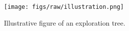 \begin{figure}[H]
    \centering
    \texttt{[image: figs/raw/illustration.png]}
    \caption{Illustrative figure of an exploration tree.}
    \label{fig:illustration}
\end{figure}

